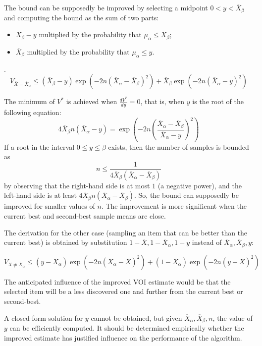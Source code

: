 \documentclass{article}
\begin{document}
The bound can be supposedly be improved by selecting a midpoint
$0 < y < \overline X_\beta$ and computing the bound as the sum of two parts:
\begin{itemize}
\item $\overline X_\beta-y$ multiplied by the probability that
  $\mu_\alpha \le \overline X_\beta$;
\item $\overline X_\beta$ multiplied by the probability that $\mu_\alpha\le
  y$.
\end{itemize}.
\[ V_{\overline X=\overline X_\alpha} \le (\overline X_\beta-y)\exp\left(-2n(\overline X_\alpha-\overline X_\beta)^2\right)+\overline X_\beta\exp\left(-2n(\overline X_\alpha-y)^2\right) \]

\vspace{\baselineskip}

The minimum of $V^*$ is achieved when $\frac {dV^*} {dy}=0$, that
is, when $y$ is the root of the following equation:
\[ 4\overline X_\beta n(\overline X_\alpha-y)=\exp\left(-2n\left(\frac {\overline X_\alpha-\overline X_\beta}
    {\overline X_\alpha-y}\right)^2\right) \]
If a root in the interval  $0\le y\le\beta$ exists, then the
number of samples is bounded as
\[n\le\frac 1 {4\overline X_\beta(\overline X_\alpha-\overline X_\beta)}\]
by observing that the right-hand side 
is at most $1$ (a negative power), and the left-hand side is at least
$4\overline X_\beta n(\overline X_\alpha-\overline X_\beta)$.
So, the bound can supposedly be improved for smaller values of
$n$. The improvement is more significant when the current best and
second-best sample means are close.

The derivation for the other case
(sampling an item that can be better than the current best) is
obtained by substitution $1-\overline X, 1-\overline X_\alpha, 1-y$ instead of
$\overline X_\alpha, \overline X_\beta, y$:

\[ V_{\overline X\ne\overline X_\alpha} \le (y-\overline X_\alpha)\exp\left(-2n(\overline X_\alpha-\overline
  X)^2\right)+(1-\overline X_\alpha)\exp\left(-2n(y-\overline X)^2\right) \]

The anticipated influence of the improved
VOI estimate would be that the selected item will be a less discovered
one and further from the current best or second-best.

A closed-form solution for $y$ cannot be obtained, but given
$\overline X_\alpha, \overline X_\beta, n$, the value of $y$ can be efficiently
computed. It should be determined empirically whether the improved
estimate has justified influence on the performance of the algorithm.



\end{document}
